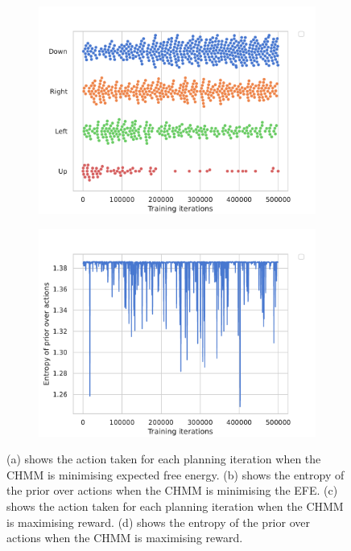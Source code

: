 \documentclass[twoside,11pt]{article}
\begin{document}
\begin{figure}[H]
\begin{subfigure}{.4\textwidth}
        \includegraphics[draft=false,width=\linewidth]{ActionPicked_reward}
        \caption{}\label{fig:action_picked_reward}
    \end{subfigure}%
    \begin{subfigure}{.4\textwidth}
        \centering
        \includegraphics[draft=false,width=\linewidth]{EntropyPriorActions_reward}
        \caption{}\label{fig:entropy_action_reward}
    \end{subfigure}

    \caption{(a) shows the action taken for each planning iteration when the CHMM is minimising expected free energy.
             (b) shows the entropy of the prior over actions when the CHMM is minimising the EFE.
             (c) shows the action taken for each planning iteration when the CHMM is maximising reward.
             (d) shows the entropy of the prior over actions when the CHMM is maximising reward.
    }
    \label{fig:actions_from_critic}
\end{figure}
\end{document}
